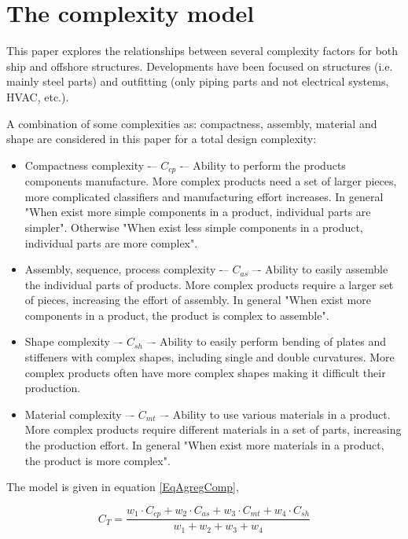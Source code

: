 \section{The complexity model}
This paper explores the relationships between several complexity factors for both ship and offshore structures. Developments have been focused on structures (i.e. mainly steel parts) and outfitting (only piping parts and not electrical systems, HVAC, etc.).


A combination of some complexities as: compactness, assembly, material and shape are considered in this paper for a total design complexity:
\begin{itemize}
\item Compactness complexity -– $C_{cp}$ -– Ability to perform the products components manufacture. More complex products need a set of larger pieces, more complicated classifiers and manufacturing effort increases. In general "When exist more simple components in a product, individual parts are simpler". Otherwise "When exist less simple components in a product, individual parts are more complex".
\item Assembly, sequence, process complexity -– $C_{as}$ –- Ability to easily assemble the individual parts of products. More complex products require a larger set of pieces, increasing the effort of assembly. In general "When exist more components in a product, the product is complex to assemble". 
\item Shape complexity –- $C_{sh}$ –- Ability to easily perform bending of plates and stiffeners with complex shapes, including single and double curvatures. More complex products often have more complex shapes making it difficult their production.
\item Material complexity –- $C_{mt}$ –- Ability to use various materials in a product. More complex products require different materials in a set of parts, increasing the production effort. In general "When exist more materials in a product, the product is more complex".
\end{itemize}


The model is given in equation \ref{EqAgregComp}, %


\begin{equation}
\label{EqAgregComp}
C_T = \frac{w_1 \cdot C_{cp} + w_2 \cdot C_{as} + w_3 \cdot C_{mt} + w_4 \cdot C_{sh} }{w_1 + w_2 + w_3 + w_4}
\end{equation}



